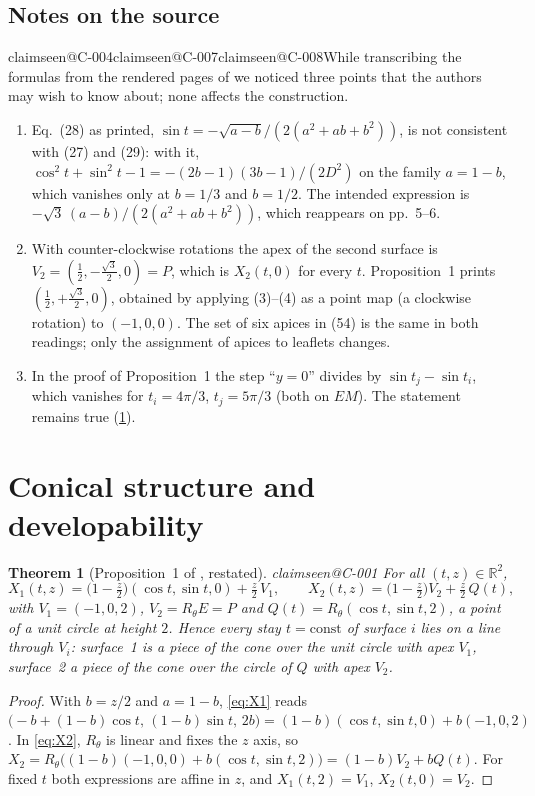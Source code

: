 \documentclass[11pt,a4paper]{article}
\makeatletter
\theoremstyle{plain}
\newtheorem{theorem}{Theorem}[section]
\theoremstyle{remark}
\newcommand{\claim}[1]{\ifcsname claimseen@#1\endcsname\else\expandafter\gdef\csname claimseen@#1\endcsname{}\label{claim:#1}\fi}
\newcommand{\R}{\mathbb{R}}
\makeatother
\begin{document}
\subsection{Notes on the source}\label{sec:source}
\claim{C-004}\claim{C-007}\claim{C-008}While transcribing the formulas from the rendered pages of \citet{McKee2026} we
noticed three points that the authors may wish to know about; none affects the construction.
\begin{enumerate}
\item Eq.~(28) as printed, $\sin t=-\sqrt{a-b}/(2(a^2+ab+b^2))$, is not consistent with (27) and (29): with it,
  $\cos^2t+\sin^2t-1=-(2b-1)(3b-1)/(2D^2)$ on the family $a=1-b$, which vanishes only at $b=1/3$ and $b=1/2$. The intended
  expression is $-\sqrt3\,(a-b)/(2(a^2+ab+b^2))$, which reappears on pp.~5--6.
\item With counter-clockwise rotations the apex of the second surface is $V_2=(\tfrac12,-\tfrac{\sqrt3}{2},0)=P$, which is
  $X_2(t,0)$ for every $t$. Proposition~1 prints $(\tfrac12,+\tfrac{\sqrt3}{2},0)$, obtained by applying (3)--(4) as a
  point map (a clockwise rotation) to $(-1,0,0)$. The set of six apices in (54) is the same in both readings; only the
  assignment of apices to leaflets changes.
\item In the proof of Proposition~1 the step ``$y=0$'' divides by $\sin t_j-\sin t_i$, which vanishes for $t_i=4\pi/3$,
  $t_j=5\pi/3$ (both on $EM$). The statement remains true (\cref{thm:cone}).
\end{enumerate}

\section{Conical structure and developability}\label{sec:cones}

\begin{theorem}[Proposition~1 of \citealp{McKee2026}, restated]\label{thm:cone}\claim{C-001}
For all $(t,z)\in\R^2$,
\[ X_1(t,z)=\big(1-\tfrac z2\big)(\cos t,\sin t,0)+\tfrac z2\, V_1,\qquad X_2(t,z)=\big(1-\tfrac z2\big)V_2+\tfrac z2\,Q(t), \]
with $V_1=(-1,0,2)$, $V_2=R_\theta E=P$ and $Q(t)=R_\theta(\cos t,\sin t,2)$, a point of a unit circle at height $2$. Hence
every stay $t=\mathrm{const}$ of surface $i$ lies on a line through $V_i$: surface~1 is a piece of the cone over the unit
circle with apex $V_1$, surface~2 a piece of the cone over the circle of $Q$ with apex $V_2$.
\end{theorem}
\begin{proof}
With $b=z/2$ and $a=1-b$, \eqref{eq:X1} reads $\big(-b+(1-b)\cos t,\,(1-b)\sin t,\,2b\big)=(1-b)(\cos t,\sin t,0)+b(-1,0,2)$.
In \eqref{eq:X2}, $R_\theta$ is linear and fixes the $z$ axis, so $X_2=R_\theta\big((1-b)(-1,0,0)+b(\cos t,\sin t,2)\big)
=(1-b)V_2+bQ(t)$. For fixed $t$ both expressions are affine in $z$, and $X_1(t,2)=V_1$, $X_2(t,0)=V_2$.
\end{proof}
\end{document}
